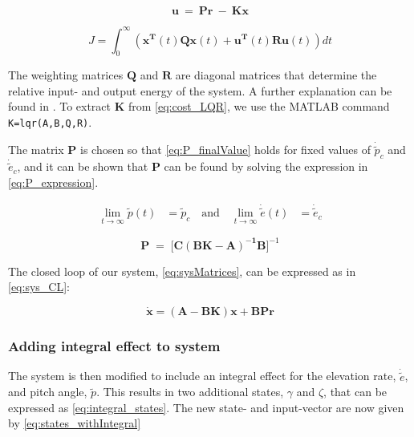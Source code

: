 \begin{equation}\label{eq:input_LQR}
    \mathbf{u\: = \: Pr\: -\: Kx }
\end{equation}

\begin{equation}\label{eq:cost_LQR}
    J= \int_{0}^{\infty} (\mathbf{x^T}(t)\mathbf{Qx}(t) + \mathbf{u^T}(t)\mathbf{Ru}(t))dt
\end{equation}

The weighting matrices $\mathbf{Q}$ and $\mathbf{R}$ are diagonal matrices that determine the relative input- and output energy of the system. A further explanation can be found in \cite{Chen2014}. To extract $\mathbf{K}$ from \cref{eq:cost_LQR}, we use the MATLAB command \texttt{K=lqr(A,B,Q,R)}.

The matrix $\mathbf{P}$ is chosen so that \cref{eq:P_finalValue} holds for fixed values of $\dot{\tilde{p}}_c$ and $\dot{\tilde{e}}_c$, and it can be shown that $\mathbf{P}$ can be found by solving the expression in \cref{eq:P_expression}\cite{Chen2014}.

\begin{equation}\label{eq:P_finalValue}
    \begin{aligned}
        \lim_{t\to\infty}\tilde{p}(t) &= \tilde{p}_c
        \quad \textrm{and} \quad
        \lim_{t\to\infty}\dot{\tilde{e}}(t) &= \dot{\tilde{e}}_c
    \end{aligned}
\end{equation}
    
\begin{equation}\label{eq:P_expression}
    \mathbf{P\;=\;[C(BK-A)^{-1}B}]^{-1}
\end{equation}

The closed loop of our system, \cref{eq:sysMatrices}, can be expressed as in \cref{eq:sys_CL}:

\begin{equation}\label{eq:sys_CL}
    \mathbf{\dot{x}} = \mathbf{(A-BK)x + BPr} 
\end{equation}

\subsubsection{Adding integral effect to system}
The system is then modified to include an integral effect for the elevation rate, $\dot{\tilde{e}}$, and pitch angle, $\tilde{p}$. This results in two additional states, $\gamma$ and $\zeta$, that can be expressed as \cref{eq:integral_states}. The new state- and input-vector are now given by \cref{eq:states_withIntegral}

